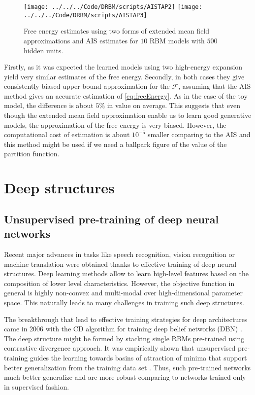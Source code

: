 \begin{figure}[!htb]
%
 \texttt{[image: ../../../Code/DRBM/scripts/AISTAP2]}
\endminipage 
{}  
 \texttt{[image: ../../../Code/DRBM/scripts/AISTAP3]}
\endminipage\hfill
  \caption[Comparison of AIS and EMF on RBM with $500$ hidden units]{Free energy estimates using two forms of extended mean field approximations and AIS estimates for $10$ RBM models with $500$ hidden units.}
  \label{fig:AISTAP2}
\end{figure}

Firstly, as it was expected the learned models using two high-energy expansion yield very similar estimates of the free energy. Secondly, in both cases they give consistently biased upper bound approximation for the $\mathcal{F}$, assuming that the AIS method gives an accurate estimation of \ref{eq:freeEnergy}. As in the case of the toy model, the difference is about $5 \%$ in value on average. 
This suggests that even though the extended mean field approximation enable us to learn good generative models, the approximation of the free energy is very biased. However, the computational cost of estimation is about $10^{-5}$ smaller comparing to the AIS and this method might be used if we need a ballpark figure of the value of the partition function.

\section{Deep structures}
\subsection{Unsupervised pre-training of deep neural networks}
Recent major advances in tasks like speech recognition, vision recognition or machine translation were obtained thanks to effective training of deep neural structures. Deep learning methods allow to learn high-level features based on the composition of lower level characteristics. However, the objective function in general is highly non-convex and multi-modal over high-dimensional parameter space. This naturally leads to many challenges in training such deep structures.
 
The breakthrough that lead to effective training strategies for deep architectures came in 2006 with the CD algorithm for training deep belief networks (DBN) \cite{hinton2006reducing}. The deep structure might be formed by stacking single RBMs pre-trained using contrastive divergence approach. It was empirically shown that unsupervised pre-training guides the learning towards basins of attraction of minima that support better generalization from the training data set \cite{erhan2010does}. Thus, such pre-trained networks much better generalize and are more robust comparing to networks trained only in supervised fashion.

